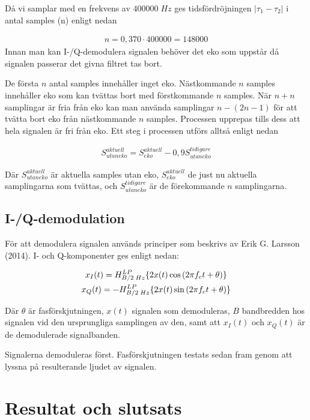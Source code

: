 \documentclass[10pt,twocolumn]{article}
\begin{document}
Då vi samplar med en frekvens av $400 000\;Hz$ ges tidsfördröjningen $|\tau_1 - \tau_2|$ i antal samples (n) enligt nedan 

\begin{gather}
n = 0,370 \cdot 400 000 = 148 000
\label{equ:delaySamples}
\end{gather}
Innan man kan I-/Q-demodulera signalen behöver det eko som uppstår då signalen passerar det givna filtret tas bort. 

De första $n$ antal samples innehåller inget eko. Nästkommande $n$ samples innehåller eko som kan tvättas bort med förstkommande $n$ samples. När $n+n$ samplingar är fria från eko kan man använda samplingar $n-(2n-1)$ för att tvätta bort eko från nästkommande $n$ samples. Processen upprepas tills dess att hela signalen är fri från eko. Ett steg i processen utförs alltså enligt nedan

\begin{gather}
S_{utan eko}^{aktuell} = S_{eko}^{aktuell} - 0,9S_{utan eko}^{tidigare}
\label{equ:eko}
\end{gather}

Där $S_{utan eko}^{aktuell}$ är aktuella samples utan eko, $S_{eko}^{aktuell}$ de just nu aktuella samplingarna som tvättas, och $S_{utan eko}^{tidigare}$ är de förekommande $n$ samplingarna. 

\subsection{I-/Q-demodulation}

För att demodulera signalen används principer som beskrivs av Erik G. Larsson (2014). I- och Q-komponenter ges enligt nedan: 

\begin{gather}
x_{I}(t) = \Large{H}_{B/2\;Hz}^{LP}\{2x(t)\cos{(2{\pi}f_{c}t + \theta)}\} \\
x_{Q}(t) = -\Large{H}_{B/2\;Hz}^{LP}\{2x(t)\sin{(2{\pi}f_{c}t + \theta)}\}
\label{equ:iq}
\end{gather}

Där $\theta$ är fasförskjutningen, $x(t)$ signalen som demoduleras, $B$ bandbredden hos signalen vid den ursprungliga samplingen av den, samt att $x_{I}(t)$ och $x_{Q}(t)$ är de demodulerade signalbanden. 

Signalerna demoduleras först. Fasförskjutningen testats sedan fram genom att lyssna på resulterande ljudet av signalen. 


\section{Resultat och slutsats}
\end{document}
